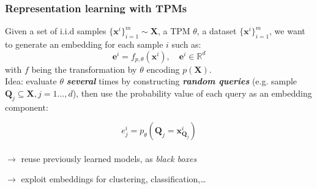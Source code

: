 \documentclass[xcolor={usenames,dvipsnames,svgnames}, compress]{beamer}
\begin{document}
\begin{frame}[t]
  \small
  \frametitle{Representation learning with TPMs}
  
  Given a set of i.i.d samples $\{\mathbf x^i\}_{i=1}^m\sim
  \mathbf{X}$,  a TPM $\theta$, a dataset $\{\mathbf x^i\}_{i=1}^m$,
  we want to generate an embedding for each sample $i$ such as:
  $$\mathbf{e}^{i}=f_{p,\theta}(\mathbf{x}^{i}),\quad \mathbf{e}^{i}\in\mathbb{R}^{d}$$
  with $f$ being the transformation by $\theta$
  encoding $p(\mathbf{X})$.\\[10pt]
  
  Idea: evaluate $\theta$ \emph{\textbf{several}} times by constructing \emph{\textbf{random
    queries}} (e.g. sample $\mathbf{Q}_{j} \subseteq \mathbf{X}, j =
  1\dots,d$),
  then use the probability value of each query as an embedding component:
  
  $$e_{j}^{i}=p_{\theta}(\mathbf{Q}_{j}=\mathbf{x}^{i}_{\mathbf{Q}_{j}})$$\\[10pt]

  $\rightarrow$ reuse previously learned models, as \emph{black boxes}\par
  $\rightarrow$ exploit embeddings for clustering, classification,\dots
  
  
\end{frame}
\end{document}

